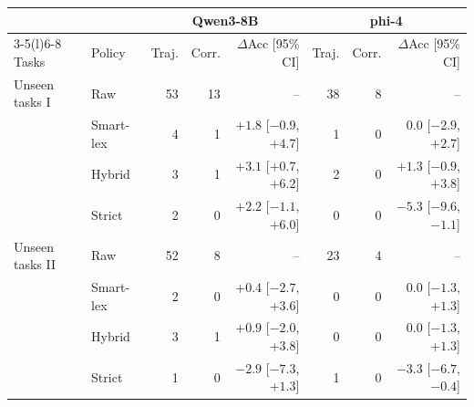 \begin{tabular}{@{}ll rrr rrr@{}}
\toprule
 & & \multicolumn{3}{c}{Qwen3-8B} & \multicolumn{3}{c}{phi-4} \\
\cmidrule(lr){3-5}\cmidrule(l){6-8}
Tasks & Policy & Traj. & Corr. & $\Delta$Acc [95\% CI] & Traj. & Corr. & $\Delta$Acc [95\% CI] \\
\midrule
Unseen tasks I & Raw & 53 & 13 & -- & 38 & 8 & -- \\
 & Smart-lex & 4 & 1 & $+1.8$ [$-0.9$, $+4.7$] & 1 & 0 & $0.0$ [$-2.9$, $+2.7$] \\
 & Hybrid & 3 & 1 & $+3.1$ [$+0.7$, $+6.2$] & 2 & 0 & $+1.3$ [$-0.9$, $+3.8$] \\
 & Strict & 2 & 0 & $+2.2$ [$-1.1$, $+6.0$] & 0 & 0 & $-5.3$ [$-9.6$, $-1.1$] \\
\midrule
Unseen tasks II & Raw & 52 & 8 & -- & 23 & 4 & -- \\
 & Smart-lex & 2 & 0 & $+0.4$ [$-2.7$, $+3.6$] & 0 & 0 & $0.0$ [$-1.3$, $+1.3$] \\
 & Hybrid & 3 & 1 & $+0.9$ [$-2.0$, $+3.8$] & 0 & 0 & $0.0$ [$-1.3$, $+1.3$] \\
 & Strict & 1 & 0 & $-2.9$ [$-7.3$, $+1.3$] & 1 & 0 & $-3.3$ [$-6.7$, $-0.4$] \\
\bottomrule
\end{tabular}
